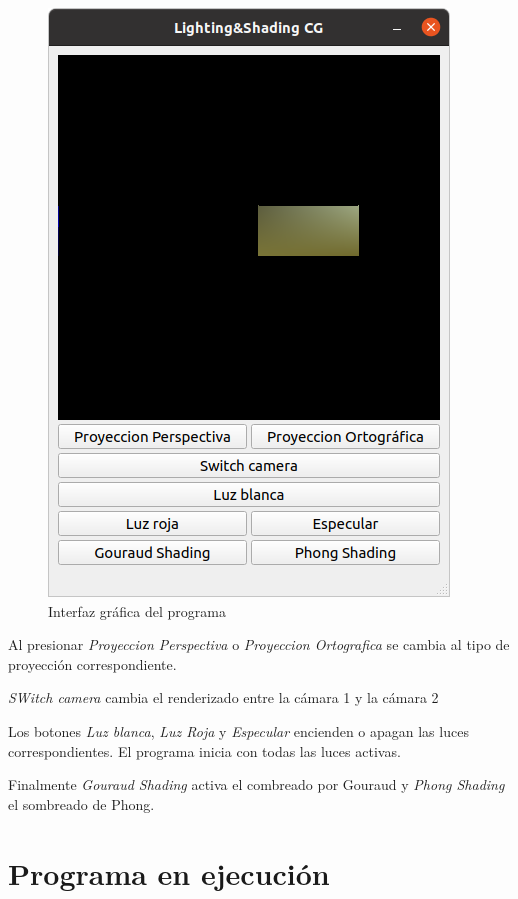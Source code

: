 \documentclass[12pt]{article}
\begin{document}
\begin{figure}[H]
\centering
\includegraphics[scale=0.5]{images/gui.png}
\caption{Interfaz gráfica del programa}
\end{figure}

Al presionar \textit{Proyeccion Perspectiva} o \textit{Proyeccion Ortografica} se cambia al tipo de proyección correspondiente.

\textit{SWitch camera} cambia el renderizado entre la cámara 1 y la cámara 2

Los botones \textit{Luz blanca}, \textit{Luz Roja} y \textit{Especular} encienden o apagan las luces correspondientes. El programa inicia con todas las luces activas.

Finalmente \textit{Gouraud Shading} activa el combreado por Gouraud y \textit{Phong Shading} el sombreado de Phong.



\section{Programa en ejecución}
\end{document}
